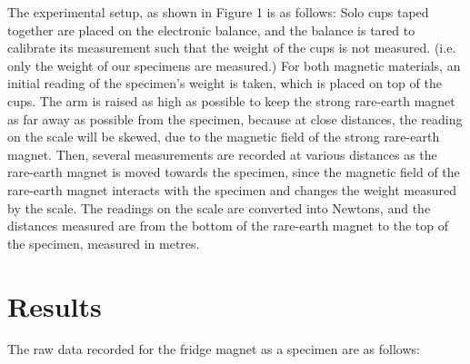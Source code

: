 \documentclass[letterpaper]{article}
\begin{document}
The experimental setup, as shown in Figure 1 is as follows:
Solo cups taped together are placed on the electronic balance,
and the balance is tared to calibrate its measurement such that
the weight of the cups is not measured. (i.e. only the weight of our
specimens are measured.) For both magnetic materials, an initial reading of the
specimen's weight is taken, which is placed on top of the cups.
The arm is raised as high as possible to keep the strong rare-earth magnet
as far away as possible from the specimen, because at close distances, the reading on the scale
will be skewed, due to the magnetic field of the strong rare-earth magnet.
Then, several measurements are recorded at various distances as the rare-earth magnet is moved towards the
specimen, since the magnetic field of the rare-earth magnet
interacts with the specimen and changes the weight measured by the scale.
The readings on the scale are converted into Newtons, and the distances measured are from the bottom
of the rare-earth magnet to the top of the specimen, measured in metres.


\section{Results}


The raw data recorded for the fridge magnet as a specimen are
as follows:
\end{document}
